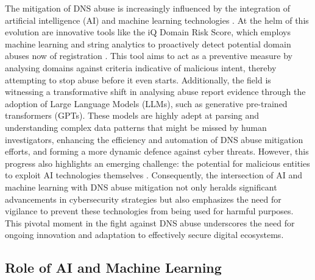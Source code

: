 The mitigation of DNS abuse is increasingly influenced by the integration of artificial intelligence (AI) and machine learning technologies \cite{goethals2021enabling}. At the helm of this evolution are innovative tools like the iQ Domain Risk Score, which employs machine learning and string analytics to proactively detect potential domain abuses now of registration \cite{dnsabuseAI2023}. This tool aims to act as a preventive measure by analysing domains against criteria indicative of malicious intent, thereby attempting to stop abuse before it even starts. Additionally, the field is witnessing a transformative shift in analysing abuse report evidence through the adoption of Large Language Models (LLMs), such as generative pre-trained transformers (GPTs). These models are highly adept at parsing and understanding complex data patterns that might be missed by human investigators, enhancing the efficiency and automation of DNS abuse mitigation efforts, and forming a more dynamic defence against cyber threats. However, this progress also highlights an emerging challenge: the potential for malicious entities to exploit AI technologies themselves \cite{halvorsenAI2023}.  Consequently, the intersection of AI and machine learning with DNS abuse mitigation not only heralds significant advancements in cybersecurity strategies but also emphasizes the need for vigilance to prevent these technologies from being used for harmful purposes. This pivotal moment in the fight against DNS abuse underscores the need for ongoing innovation and adaptation to effectively secure digital ecosystems.

\subsection{Role of AI and Machine Learning}

